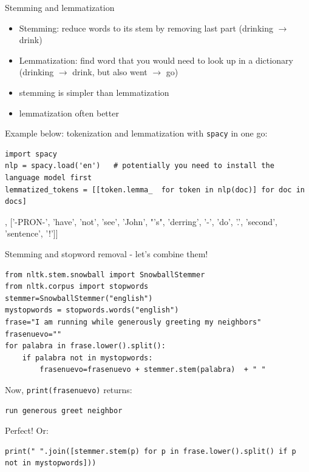 \documentclass[handout]{beamer}
\begin{document}
\begin{frame}[fragile]{Stemming and lemmatization}
\begin{itemize}
\item Stemming: reduce words to its stem by removing last part (drinking $\rightarrow$ drink)
\item Lemmatization: find word that you would need to look up in a dictionary (drinking $\rightarrow$ drink, but also went $\rightarrow$ go)
\item stemming is simpler than lemmatization
\item lemmatization often better
\end{itemize}
\pause

Example below: tokenization and lemmatization with \texttt{spacy} in one go:
\begin{lstlisting}
import spacy
nlp = spacy.load('en')   # potentially you need to install the language model first
lemmatized_tokens = [[token.lemma_  for token in nlp(doc)] for doc in docs]
\end{lstlisting}
\begin{lstlistingoutputtiny}
[['this', 'be', 'a', 'text'], ['-PRON-', 'have', 'not', 'see', 'John', "'s", 'derring', '-', 'do', '.', 'second', 'sentence', '!']]
\end{lstlistingoutputtiny}
\end{frame}




\begin{frame}[fragile]{Stemming and stopword removal - let's combine them!}
\begin{lstlisting}
from nltk.stem.snowball import SnowballStemmer
from nltk.corpus import stopwords
stemmer=SnowballStemmer("english")
mystopwords = stopwords.words("english")
frase="I am running while generously greeting my neighbors"
frasenuevo=""
for palabra in frase.lower().split():
	if palabra not in mystopwords:
		frasenuevo=frasenuevo + stemmer.stem(palabra)  + " "
\end{lstlisting}
Now, {\tt{print(frasenuevo)}} returns:
\begin{lstlisting}
run generous greet neighbor
\end{lstlisting}
Perfect!
\pause
\small
Or:
\begin{lstlisting}
print(" ".join([stemmer.stem(p) for p in frase.lower().split() if p not in mystopwords]))
\end{lstlisting}

\end{frame}
\end{document}
